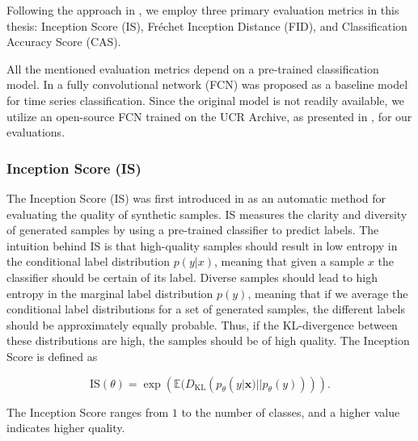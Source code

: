 \documentclass[../../thesis.tex]{subfiles}
\begin{document}
Following the approach in \cite{TimeVQVAE}, we employ three primary evaluation metrics in this thesis: Inception Score (IS), Fréchet Inception Distance (FID), and Classification Accuracy Score (CAS).\newline

All the mentioned evaluation metrics depend on a pre-trained classification model. In \cite{wang2016time} a fully convolutional network (FCN) was proposed as a baseline model for time series classification. Since the original model is not readily available, we utilize an open-source FCN trained on the UCR Archive, as presented in \cite{TimeVQVAE}, for our evaluations.

\subsubsection{Inception Score (IS)}

The Inception Score (IS) was first introduced in \cite{salimans2016improved} as an automatic method for evaluating the quality of synthetic samples. IS measures the clarity and diversity of generated samples by using a pre-trained classifier to predict labels. The intuition behind IS is that high-quality samples should result in low entropy in the conditional label distribution $p(y|x)$, meaning that given a sample $x$ the classifier should be certain of its label. Diverse samples should lead to high entropy in the marginal label distribution $p(y)$, meaning that if we average the conditional label distributions for a set of generated samples, the different labels should be approximately equally probable. Thus, if the KL-divergence between these distributions are high, the samples should be of high quality. The Inception Score is defined as 

\begin{equation}
    \label{IS}
    {\text{IS}}(\theta) = \exp\left( \mathbb{E}(D_{\text{KL}}(p_\theta(y|\mathbf{x}) || p_\theta(y))) \right).
\end{equation}

The Inception Score ranges from $1$ to the number of classes, and a higher value indicates higher quality. \newline


\end{document}
